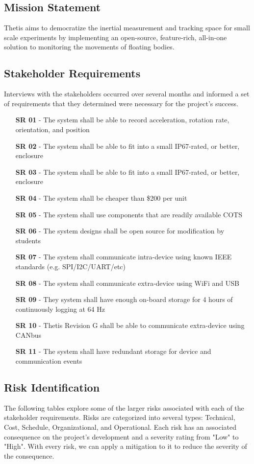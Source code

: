 \subsection{Mission Statement} \label{ssec:mission_statement}
Thetis aims to democratize the inertial measurement and tracking space for small scale experiments by implementing an open-source, feature-rich, all-in-one solution to monitoring the movements of floating bodies.

\subsection{Stakeholder Requirements} \label{ssec:stakeholder_reqs}
Interviews with the stakeholders occurred over several months and informed a set of requirements that they determined were necessary for the project's success.

\begin{itemize}
	\item[\textbf{SR 01}] - The system shall be able to record acceleration, rotation rate, orientation, and position
	\item[\textbf{SR 02}] - The system shall be able to fit into a small IP67-rated, or better, enclosure
	\item[\textbf{SR 03}] - The system shall be able to fit into a small IP67-rated, or better, enclosure
	\item[\textbf{SR 04}] - The system shall be cheaper than \$200 per unit
	\item[\textbf{SR 05}] - The system shall use components that are readily available COTS
	\item[\textbf{SR 06}] - The system designs shall be open source for modification by students
	\item[\textbf{SR 07}] - The system shall communicate intra-device using known IEEE standards (e.g. SPI/I2C/UART/etc)
	\item[\textbf{SR 08}] - The system shall communicate extra-device using WiFi and USB
	\item[\textbf{SR 09}] - They system shall have enough on-board storage for 4 hours of continuously logging at 64 Hz
	\item[\textbf{SR 10}] - Thetis Revision G shall be able to communicate extra-device using CANbus
	\item[\textbf{SR 11}] - The system shall have redundant storage for device and communication events
\end{itemize}


\subsection{Risk Identification} \label{ssec:risk_identification}
The following tables explore some of the larger risks associated with each of the stakeholder requirements.
Risks are categorized into several types: Technical, Cost, Schedule, Organizational, and Operational.
Each risk has an associated consequence on the project's development and a severity rating from "Low" to "High".
With every risk, we can apply a mitigation to it to reduce the severity of the consequence.

